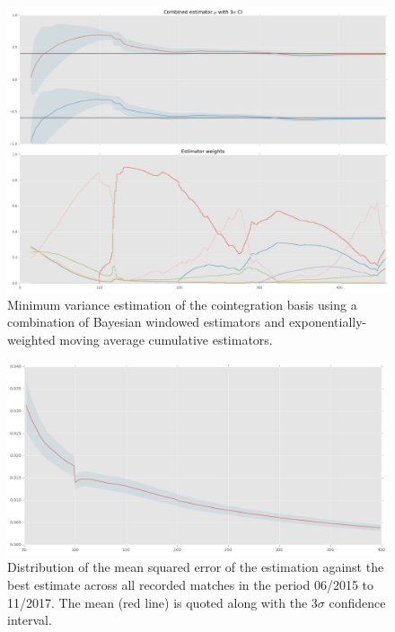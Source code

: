 \begin{figure}[H]
    \centering
    \includegraphics[width=\figwidth]{img/estimation/mve.png}

    \caption{Minimum variance estimation of the cointegration basis using a
    combination of Bayesian windowed estimators and exponentially-weighted
    moving average cumulative estimators.}\label{fig:estimation:mve}
\end{figure}

\begin{figure}[H]
    \centering
    \includegraphics[width=\figwidth]{img/estimation/mse.png}

    \caption{Distribution of the mean squared error of the estimation against
    the best estimate across all recorded matches in the period 06/2015 to
    11/2017. The mean (red line) is quoted along with the $3\sigma$ confidence
    interval.}\label{fig:estimation:mse}
\end{figure}
